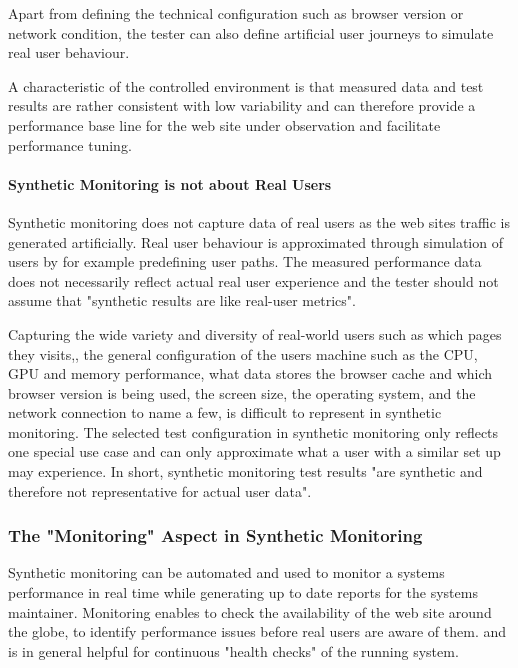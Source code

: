 Apart from defining the technical configuration such as browser version or network condition, the tester can also define artificial user journeys to simulate real user behaviour. %

A characteristic of the controlled environment is that measured data and test results are rather consistent with low variability and can therefore provide a performance base line for the web site under observation and facilitate performance tuning.%


\paragraph{Synthetic Monitoring is not about Real Users}

Synthetic monitoring does not capture data of real users as the web sites traffic is generated artificially.
Real user behaviour is approximated through simulation of users by for example predefining user paths.
The measured performance data does not necessarily reflect actual real user experience and the tester should not assume that "synthetic results are like real-user metrics". %

Capturing the wide variety and diversity of real-world users such as which pages they visits,, the general configuration of the users machine such as the CPU, GPU and memory performance, what data stores the browser cache and which browser version is being used, the screen size, the operating system, and the network connection to name a few, is difficult to represent in synthetic monitoring. %
The selected test configuration in synthetic monitoring only reflects one special use case and can only approximate what a user with a similar set up may experience. %
In short, synthetic monitoring test results "are synthetic and therefore not representative for actual user data".  %



\subsubsection{The "Monitoring" Aspect in Synthetic Monitoring}


Synthetic monitoring can be automated and used to monitor a systems performance in real time while generating up to date reports for the systems maintainer. %
Monitoring enables to check the availability of the web site around the globe, %
to identify performance issues before real users are aware of them. %
and is in general helpful for continuous "health checks" of the running system. %

